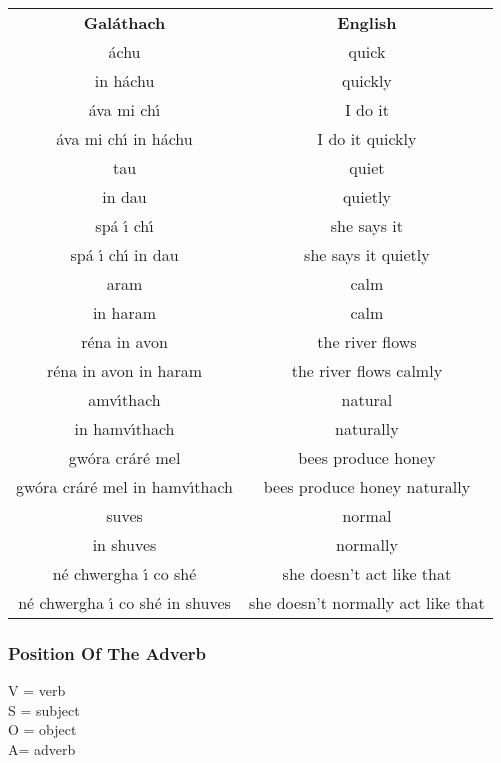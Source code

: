 \begin{table}[H]
\centering
\begin{tabular}{cc}
  \toprule
  \textbf{Gal\'{a}thach} & \textbf{English}\\
  \cmidrule(lr){1-1}\cmidrule(lr){2-2}
  \'{a}chu & quick\\
  in h\'{a}chu & quickly\\
  \'{a}va mi ch\'{\i} & I do it\\
  \'{a}va mi ch\'{\i} in h\'{a}chu & I do it quickly\\
  \cmidrule(lr){1-1}\cmidrule(lr){2-2}
  tau & quiet\\
  in dau & quietly\\
  sp\'{a} \'{\i} ch\'{\i} & she says it\\
  sp\'{a} \'{\i} ch\'{\i} in dau & she says it quietly\\
  \cmidrule(lr){1-1}\cmidrule(lr){2-2}
  aram & calm\\
  in haram & calm\\
  r\'{e}na in avon & the river flows\\
  r\'{e}na in avon in haram & the river flows calmly\\
  \cmidrule(lr){1-1}\cmidrule(lr){2-2}
  amv\'{\i}thach & natural\\
  in hamv\'{\i}thach & naturally\\
  gw\'{o}ra cr\'{a}r\'{e} mel & bees produce honey\\
  gw\'{o}ra cr\'{a}r\'{e} mel in hamv\'{\i}thach & bees produce honey naturally\\
  \cmidrule(lr){1-1}\cmidrule(lr){2-2}
  suves & normal\\
  in shuves & normally\\
  n\'{e} chwergha \'{\i} co sh\'{e} & she doesn't act like that\\
  n\'{e} chwergha \'{\i} co sh\'{e} in shuves & she doesn't normally act like that\\
  \bottomrule
\end{tabular}
\label{examples_adverb}
\end{table}

\subsubsection{Position Of The Adverb}

V = verb \\
S = subject\\
O = object \\
A= adverb \\

